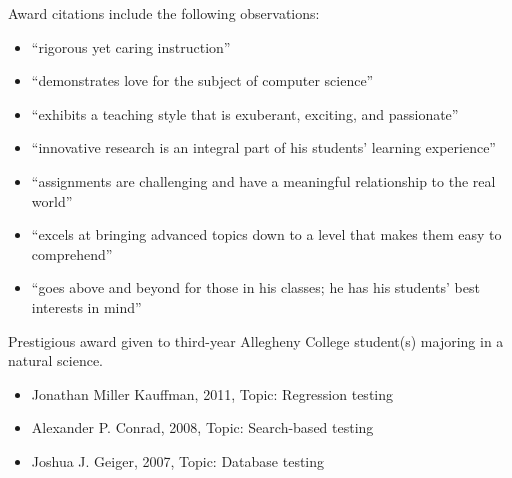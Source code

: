\documentclass[11pt,letterpaper,sans]{moderncv}
\begin{document}
{Award citations include the following observations: \vspace*{.025in}
  \begin{itemize}
    \renewcommand\labelitemi{\Large\textbullet}
    \item ``rigorous yet caring instruction''
    \item ``demonstrates love for the subject of computer science''
    \item ``exhibits a teaching style that is exuberant, exciting, and passionate''
    \item ``innovative research is an integral part of his students’ learning experience''
    \item ``assignments are challenging and have a meaningful relationship to the real world''
    \item ``excels at bringing advanced topics down to a level that makes them easy to comprehend''
    \item ``goes above and beyond for those in his classes; he has his students’ best interests in mind''
  \end{itemize}}


{Prestigious award given to third-year Allegheny College student(s) majoring in a natural science.\vspace*{.025in}
  \begin{itemize}
    \renewcommand\labelitemi{\Large\textbullet}
  \item Jonathan Miller Kauffman, 2011, Topic: Regression testing
  \item Alexander P. Conrad, 2008, Topic: Search-based testing
  \item Joshua J. Geiger, 2007, Topic: Database testing
\end{itemize}
\vspace*{.05in}
}

\end{document}
